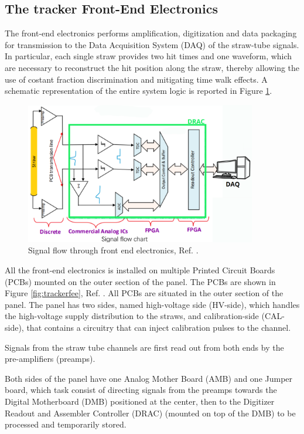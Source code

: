 \subsection{The tracker Front-End Electronics}\label{tfee}
The front-end electronics performs amplification, digitization and data packaging 
for transmission to the Data Acquisition System (DAQ) of the straw-tube signals. 
In particular, each single straw provides two hit times and one waveform, 
which are necessary to reconstruct the hit position along the straw, 
thereby allowing the use of costant fraction discrimination and mitigating time walk effects. 
A schematic representation of the entire system logic is reported in Figure \ref{fig:flowfee}.
\begin{figure}[!h]
    \centering
    \includegraphics[width =0.9\textwidth]{figures/png/Screenshot_20240529_133230.png}
    \caption{Signal flow through front end electronics, Ref. \cite{bartoszek2015mu2e}.}
    \label{fig:flowfee}
    \end{figure}
All the front-end electronics is installed on multiple Printed Circuit Boards 
(PCBs) mounted on the outer section of the panel. 
The PCBs are shown in Figure \ref{fig:trackerfee}, Ref. \cite{vadimmu2e}.
All PCBs are situated in the outer section of the panel. 
The panel has two sides, named high-voltage side (HV-side), 
which handles the high-voltage supply distribution to the straws, and 
calibration-side (CAL-side), that contains a circuitry that can inject calibration
pulses to the channel.

Signals from the straw tube channels are first read 
out from both ends by the pre-amplifiers (preamps).

Both sides of the panel have one Analog Mother Board (AMB) and one Jumper board, 
which task consist of directing signals from the preamps towards the Digital 
Motherboard (DMB) positioned at the center, then to the Digitizer Readout and 
Assembler Controller (DRAC) (mounted on top of the DMB) to be processed and 
temporarily stored. 

